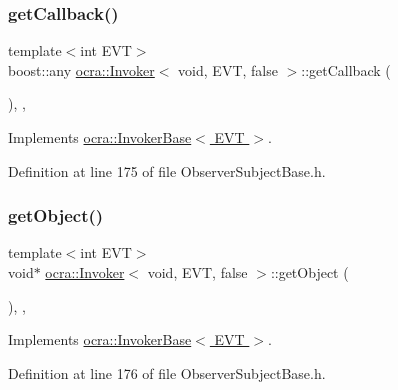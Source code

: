 \subsubsection{\texorpdfstring{get\+Callback()}{getCallback()}}
{\footnotesize\ttfamily template$<$int E\+VT$>$ \\
boost\+::any \hyperlink{classocra_1_1Invoker}{ocra\+::\+Invoker}$<$ void, E\+VT, false $>$\+::get\+Callback (\begin{DoxyParamCaption}{ }\end{DoxyParamCaption})\hspace{0.3cm}{\ttfamily [inline]}, {\ttfamily [protected]}, {\ttfamily [virtual]}}



Implements \hyperlink{classocra_1_1InvokerBase_aab9488dbb26120ccfa7c77be11c01ba9}{ocra\+::\+Invoker\+Base$<$ E\+V\+T $>$}.



Definition at line 175 of file Observer\+Subject\+Base.\+h.

\hypertarget{classocra_1_1Invoker_3_01void_00_01EVT_00_01false_01_4_a2d32f4dcaca9ae526b89e28cf2a3fc70}{}\label{classocra_1_1Invoker_3_01void_00_01EVT_00_01false_01_4_a2d32f4dcaca9ae526b89e28cf2a3fc70} 
\subsubsection{\texorpdfstring{get\+Object()}{getObject()}}
{\footnotesize\ttfamily template$<$int E\+VT$>$ \\
void$\ast$ \hyperlink{classocra_1_1Invoker}{ocra\+::\+Invoker}$<$ void, E\+VT, false $>$\+::get\+Object (\begin{DoxyParamCaption}{ }\end{DoxyParamCaption})\hspace{0.3cm}{\ttfamily [inline]}, {\ttfamily [protected]}, {\ttfamily [virtual]}}



Implements \hyperlink{classocra_1_1InvokerBase_a90d81926209cb3119933412f742bc245}{ocra\+::\+Invoker\+Base$<$ E\+V\+T $>$}.



Definition at line 176 of file Observer\+Subject\+Base.\+h.

\hypertarget{classocra_1_1Invoker_3_01void_00_01EVT_00_01false_01_4_a483d45eb6e668e5c97b9861840f4d6ea}{}\label{classocra_1_1Invoker_3_01void_00_01EVT_00_01false_01_4_a483d45eb6e668e5c97b9861840f4d6ea} 
